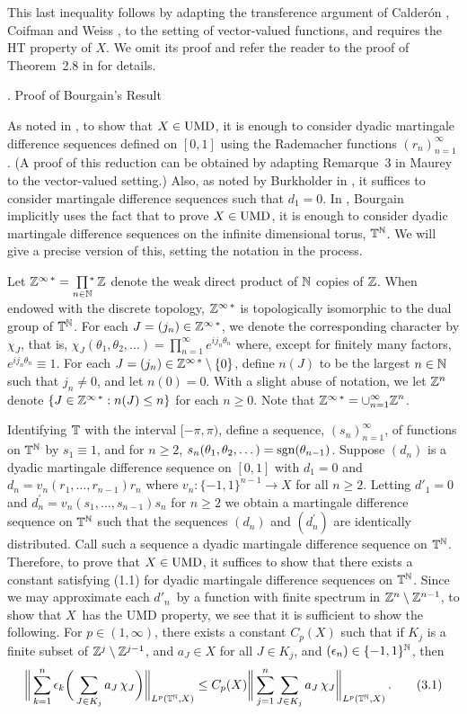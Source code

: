 This last inequality follows by adapting the transference argument 
of Calder\'on \cite{10}, 
Coifman and Weiss \cite{11}, 
to the setting of vector-valued functions,
and requires the HT property of $X$.
We omit its proof and 
refer the reader to the proof of Theorem~2.8 in \cite{5} 
for details.
\endprf\endremark
 
. Proof of Bourgain's Result
\endspecialhead
 
As noted in \cite{9}, to show that $X\in\text{UMD}$, it is enough
to consider dyadic martingale difference sequences defined
on $[0,1]$ using the Rademacher functions
$(r_n)_{n=1}^\infty$. (A proof of this reduction can be
obtained by adapting Remarque~3 in Maurey \cite{14} to the
vector-valued setting.) Also, as noted by Burkholder in  \cite{9}, 
it suffices to consider martingale difference sequences
such that $d_1=0$. In \cite{6}, Bourgain implicitly uses the
fact that to prove $X\in\text{UMD}$, it is enough to consider
dyadic martingale difference sequences on the infinite
dimensional torus, $\Bbb T^\Bbb N$. We will give a precise version
of this, setting the notation in the process.
 
Let $\dualz=\wprod$ denote the weak direct product of $\Bbb N$ copies of $\Bbb Z$.
When endowed with the discrete topology, ${\Bbb Z^{\infty\,\ast}}$ is
topologically isomorphic to the dual group of $ \Bbb T^\Bbb N $. For
each $J=(j_n)\in{\Bbb Z^{\infty\,\ast}}$, we denote the corresponding
character by $\chi_J$, that is,
$\chi_J(\theta_1,\theta_2,\dots)=\prod\limits_{n=1}^\infty
e^{ij_n\theta_n}$ where, except for finitely many factors,
$e^{ij_n\theta_n}\equiv 1$. For each
$J=(j_n)\in{\Bbb Z^{\infty\,\ast}}\setminus\{ 0 \}$, define $n(J)$ to
be the largest $n\in\Bbb N$ such that $j_n\neq0$, and let
$n(0 )=0$.
With a slight abuse of notation,
we let $\Bbb Z^n$ denote $\{J\in{\Bbb Z^{\infty\,\ast}}:n(J)\le n \}$ for each
$n\ge 0$. Note that
${\Bbb Z^{\infty\,\ast}}=\displaystyle{\cup_{n=1}^\infty\Bbb Z^n}$.
 
Identifying $\Bbb T$ with the interval $[-\pi,\pi)$, define a
sequence, $(s_n)_{n=1}^\infty$, of functions on $\Bbb T^\Bbb N$ by
$s_1 \equiv 1$, and for $n\ge 2$,
$s_n(\theta_1,\theta_2,\dots)=\text{sgn}(\theta_{n-1})$.
Suppose  $(d_n)$ is a dyadic martingale difference sequence
on $[0,1]$ with $d_1=0$ and $d_n=v_n(r_1,\dots,r_{n-1})r_n$
where $v_n:\{-1,1\}^{n-1}\to X$ for all $n\ge 2$. Letting $d'_1=0$ and
$d_n^\prime=v_n(s_1,\dots,s_{n-1})s_n$ for $n\ge 2$ we
obtain a martingale difference sequence on $\Bbb T^\Bbb N$ such that
the sequences
$(d_n)$ and $(d_n^\prime)$ are identically distributed.
Call such a sequence a dyadic martingale difference
sequence on $\Bbb T^\Bbb N$. Therefore, to prove that $X\in\text{UMD}$, it
suffices to show that there exists a constant satisfying
(1.1) for dyadic martingale difference sequences on $\Bbb T^\Bbb N$.
Since we may approximate each $d'_n$\ by a function with finite
spectrum in $\Bbb Z^n\setminus\Bbb Z^{n-1}$, to show that $X$\ has the 
UMD property, we see that it is
sufficient to show the following.
For $p \in (1,\infty)$,
there exists a constant $C_p(X)$ such that
if $K_j$ is a finite subset of $\Bbb Z^j\setminus\Bbb Z^{j-1}$, 
and $a_J\in X$ for all
$J\in K_j$, and
$(\epsilon_n)\in\{-
1,1\}^\Bbb N$, then
$$ \bigg\| \sum_{k=1}^n\epsilon_k\bigg(\sum_{J\in
K_j}a_J\,\chi_J
\bigg)\bigg\|_{L^p(\Bbb T^\Bbb N,X)}\leq
C_p (X)\bigg\| \sum_{j=1}^n \sum_{J\in K_j}
a_J\,\chi_J \bigg\|_{L^p(\Bbb T^\Bbb N,X)}\,.\tag{3.1}$$

